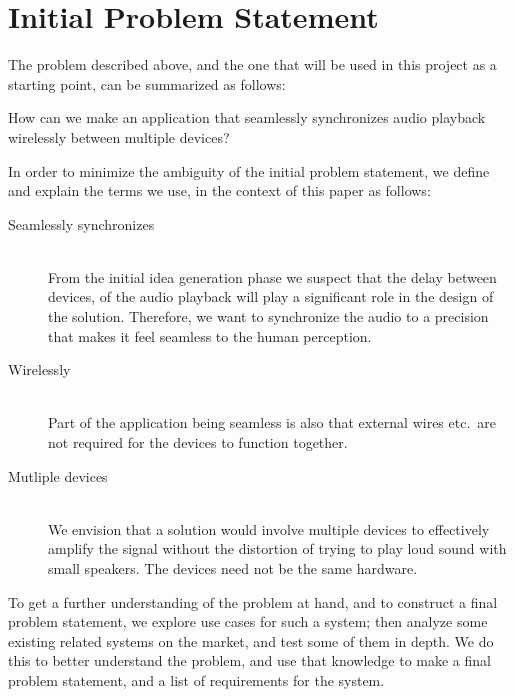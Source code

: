 \section{Initial Problem Statement}\label{sec:initial_problem}

The problem described above, and the one that will be used
in this project as a starting point, can be summarized as follows:

\begin{problemstatement}
    How can we make an application that seamlessly synchronizes audio
    playback wirelessly between multiple devices?
\end{problemstatement}

\noindent
In order to minimize the ambiguity of the initial problem statement,
we define and explain the terms we use, in the context of this paper as follows:

\begin{description}
    \item[Seamlessly synchronizes]  \hfill \\
        From the initial idea generation phase we suspect
        that the delay between devices, of the audio playback will
        play a significant role in the design of the solution. Therefore, we
        want to synchronize the audio to a precision that makes it feel
        seamless to the human perception.
    \item[Wirelessly]  \hfill \\
        Part of the application being seamless is also that external wires etc.\ are
        not required for the devices to function together.
    \item[Mutliple devices]  \hfill \\
        We envision that a solution would involve multiple devices to effectively
        amplify the signal without the distortion of trying to play loud sound with
        small speakers. The devices need not be the same hardware.
\end{description}

To get a further understanding of the problem at hand, and to
construct a final problem statement, we explore use cases for such a system;
then analyze some existing related systems on the market,
and test some of them in depth.
We do this to better understand the problem, and use that knowledge
to make a final problem statement, and a list of requirements for the system.
